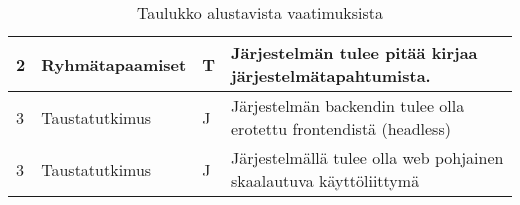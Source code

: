 \begin{landscape}
\begin{table}[]
{\begin{tabular}{llll}
    \multicolumn{1}{|l|}{2}                                            & \multicolumn{1}{l|}{Ryhmätapaamiset}                                      & \multicolumn{1}{l|}{T}                                    & \multicolumn{1}{l|}{Järjestelmän tulee pitää kirjaa järjestelmätapahtumista.}                               \\ \hline
    \multicolumn{1}{|l|}{3}                                            & \multicolumn{1}{l|}{Taustatutkimus}                                      & \multicolumn{1}{l|}{J}                                    & \multicolumn{1}{l|}{Järjestelmän backendin tulee olla erotettu frontendistä (headless)}                               \\ \hline
    \multicolumn{1}{|l|}{3}                                            & \multicolumn{1}{l|}{Taustatutkimus}                                      & \multicolumn{1}{l|}{J}                                    & \multicolumn{1}{l|}{Järjestelmällä tulee olla web pohjainen skaalautuva käyttöliittymä}                               \\ \hline
   

    \end{tabular}
}
    \caption{Taulukko alustavista vaatimuksista}
    \label{tab:vaatimukset}
    \end{table}	
\end{landscape}
